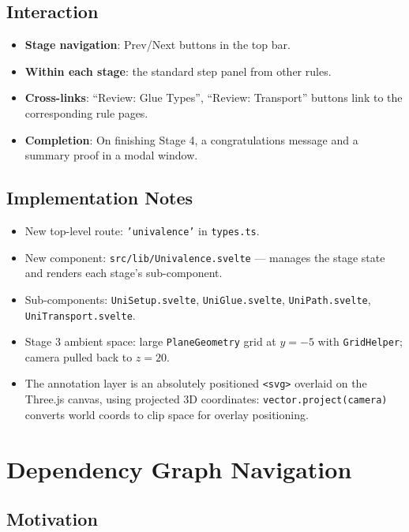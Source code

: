 \documentclass[11pt,a4paper]{article}
\begin{document}
\subsection{Interaction}

\begin{itemize}
  \item \textbf{Stage navigation}: Prev/Next buttons in the top bar.
  \item \textbf{Within each stage}: the standard step panel from other rules.
  \item \textbf{Cross-links}: ``Review: Glue Types'', ``Review: Transport''
    buttons link to the corresponding rule pages.
  \item \textbf{Completion}: On finishing Stage 4, a congratulations message
    and a summary proof in a modal window.
\end{itemize}

\subsection{Implementation Notes}

\begin{itemize}
  \item New top-level route: \texttt{'univalence'} in \texttt{types.ts}.
  \item New component: \texttt{src/lib/Univalence.svelte} — manages the
    stage state and renders each stage's sub-component.
  \item Sub-components: \texttt{UniSetup.svelte}, \texttt{UniGlue.svelte},
    \texttt{UniPath.svelte}, \texttt{UniTransport.svelte}.
  \item Stage 3 ambient space: large \texttt{PlaneGeometry} grid
    at $y = -5$ with \texttt{GridHelper}; camera pulled back to
    $z = 20$.
  \item The annotation layer is an absolutely positioned \texttt{<svg>}
    overlaid on the Three.js canvas, using projected 3D coordinates:
    \texttt{vector.project(camera)} converts world coords to clip space
    for overlay positioning.
\end{itemize}

\section{Dependency Graph Navigation}

\subsection{Motivation}
\end{document}
